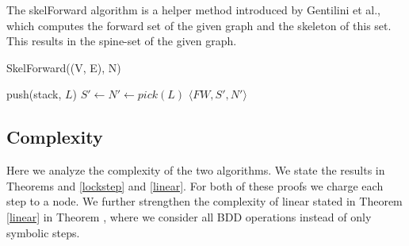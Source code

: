 \documentclass[../master/master.tex]{subfiles}
\begin{document}
The skelForward algorithm is a helper method introduced by Gentilini et al., which computes the forward set of the given graph and the skeleton of this set. This results in the spine-set of the given graph.

\begin{algorithm}[H]
  \caption{SkelForward((V, E), N)}
  \begin{algorithmic}[1]
    \Statex
    \State push(stack, $L$)
    \EndWhile
    \Statex
    \State $S' \gets N' \gets pick(L)$
    \EndWhile
    \Statex
    \State \Return $\langle FW, S', N' \rangle$
  \end{algorithmic}
\end{algorithm}
\subsection{Complexity}
Here we analyze the complexity of the two algorithms. We state the results in Theorems  and \ref{lockstep} and \ref{linear}. For both of these proofs we charge each step to a node. We further strengthen the complexity of linear stated in Theorem \ref{linear} in Theorem \label{linear-strengthened}, where we consider all BDD operations instead of only symbolic steps.
\end{document}
